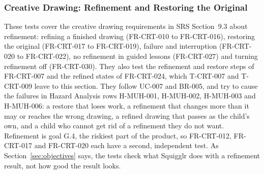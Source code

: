 \documentclass[12pt, titlepage]{article}
\begin{document}
\subsubsection{Creative Drawing: Refinement and Restoring the Original}
\label{sec:crt-refine-tests}

These tests cover the creative drawing requirements in SRS Section~9.3 about
refinement: refining a finished drawing (FR-CRT-010 to FR-CRT-016), restoring
the original (FR-CRT-017 to FR-CRT-019), failure and interruption (FR-CRT-020
to FR-CRT-022), no refinement in guided lessons (FR-CRT-027) and turning
refinement off (FR-CRT-030). They also test the refinement and restore steps
of FR-CRT-007 and the refined states of FR-CRT-024, which T-CRT-007 and
T-CRT-009 leave to this section. They follow UC-007 and BR-005, and try to
cause the failures in Hazard Analysis rows H-MUH-001, H-MUH-002, H-MUH-003
and H-MUH-006: a restore that loses work, a refinement that changes more than
it may or reaches the wrong drawing, a refined drawing that passes as the
child's own, and a child who cannot get rid of a refinement they do not want.
Refinement is goal G.4, the riskiest part of the product, so FR-CRT-012,
FR-CRT-017 and FR-CRT-020 each have a second, independent test. As
Section~\ref{sec:objectives} says, the tests check what Squigglr does with a
refinement result, not how good the result looks.
\end{document}
